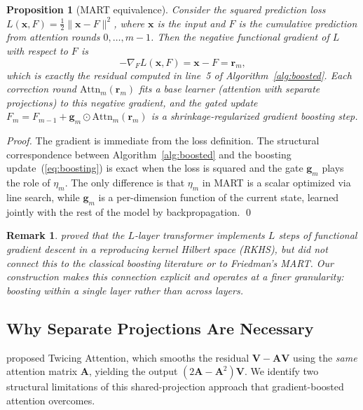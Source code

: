 \documentclass{article}
\newtheorem{proposition}{Proposition}
\newtheorem{remark}{Remark}
\theoremstyle{definition}
\begin{document}
\begin{proposition}[MART equivalence]
\label{prop:mart}
Consider the squared prediction loss $L(\mathbf{x}, F) = \frac{1}{2}\|\mathbf{x} - F\|^2$, where $\mathbf{x}$ is the input and $F$ is the cumulative prediction from attention rounds $0, \ldots, m-1$.
Then the negative functional gradient of $L$ with respect to $F$ is
\begin{equation}
    -\nabla_F L(\mathbf{x}, F) = \mathbf{x} - F = \mathbf{r}_m,
\end{equation}
which is exactly the residual computed in line~5 of Algorithm~\ref{alg:boosted}.
Each correction round $\mathrm{Attn}_m(\mathbf{r}_m)$ fits a base learner (attention with separate projections) to this negative gradient, and the gated update $F_m = F_{m-1} + \mathbf{g}_m \odot \mathrm{Attn}_m(\mathbf{r}_m)$ is a shrinkage-regularized gradient boosting step.
\end{proposition}

\begin{proof}
The gradient is immediate from the loss definition.
The structural correspondence between Algorithm~\ref{alg:boosted} and the boosting update~(\ref{eq:boosting}) is exact when the loss is squared and the gate $\mathbf{g}_m$ plays the role of $\eta_m$.
The only difference is that $\eta_m$ in MART is a scalar optimized via line search, while $\mathbf{g}_m$ is a per-dimension function of the current state, learned jointly with the rest of the model by backpropagation. \qed
\end{proof}

\begin{remark}
\citet{cheng2024transformers} proved that the $L$-layer transformer implements $L$ steps of functional gradient descent in a reproducing kernel Hilbert space (RKHS), but did not connect this to the classical boosting literature or to Friedman's MART.
Our construction makes this connection explicit and operates at a finer granularity: boosting within a single layer rather than across layers.
\end{remark}


\subsection{Why Separate Projections Are Necessary}

\citet{abdullaev2025twicing} proposed Twicing Attention, which smooths the residual $\mathbf{V} - \mathbf{A}\mathbf{V}$ using the \emph{same} attention matrix $\mathbf{A}$, yielding the output $(2\mathbf{A} - \mathbf{A}^2)\mathbf{V}$.
We identify two structural limitations of this shared-projection approach that gradient-boosted attention overcomes.
\end{document}
